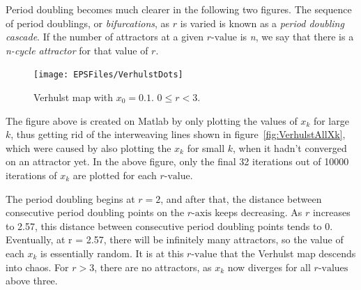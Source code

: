 \documentclass[a4wide, 10pt]{article}
\begin{document}
Period doubling becomes much clearer in the following two figures. The sequence of period doublings,
 or \emph{bifurcations}, as $r$ is varied is known as a \emph{period doubling cascade}. If the number
  of attractors at a given $r \textrm{-value}$ is \emph{n}, we say that there is a \emph{n-cycle
   attractor} for that value of $r$.

\begin{figure}[H]

    \centering

    \texttt{[image: EPSFiles/VerhulstDots]}

    \caption{Verhulst map with $ x_{0} = 0.1 $. $0 \leq r < 3$.}
    
    \label{fig:VerhulstDots}

\end{figure}

The figure above is created on Matlab by only plotting the values of $x_{k}$ for large $k$,
 thus getting rid of the interweaving lines shown in figure~\ref{fig:VerhulstAllXk}, which were caused by also plotting the $x_{k}$ for small $k$, when it hadn't
   converged on an attractor yet. In the above figure, only the final 32 iterations
    out of 10000 iterations of $x_{k}$ are plotted for each $r \textrm{-value}$. 



The period doubling begins at $r = 2$, and after that, the distance between
 consecutive period doubling points on the $r \textrm{-axis}$ keeps decreasing. As
  $r$ increases to 2.57, this distance between consecutive period doubling points
   tends to 0. Eventually, at r = 2.57, there will be infinitely many attractors, so
    the value of each $x_{k}$ is essentially random\cite{Verhulst Map Period Doubling Information}. It is at this $r \textrm{-value}$
     that the Verhulst map descends into chaos. For $r > 3$, there are no attractors, 
      as $x_{k}$ now diverges for all $r \textrm{-values}$ above three.
\end{document}
